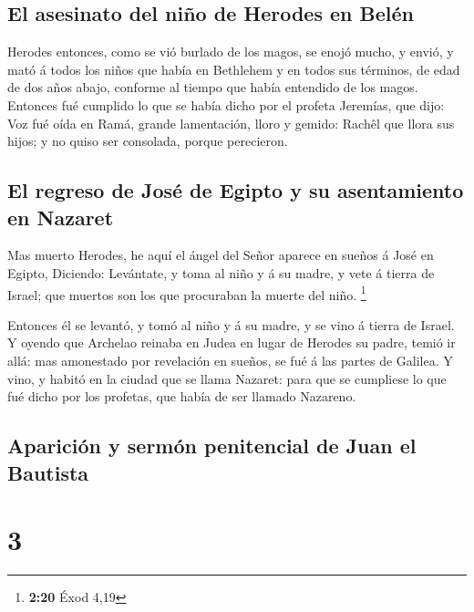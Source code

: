 \hypertarget{el-asesinato-del-niuxf1o-de-herodes-en-beluxe9n}{%
\subsection{El asesinato del niño de Herodes en
Belén}\label{el-asesinato-del-niuxf1o-de-herodes-en-beluxe9n}}

 Herodes entonces, como se vió burlado de los magos, se
enojó mucho, y envió, y mató á todos los niños que había en Bethlehem y
en todos sus términos, de edad de dos años abajo, conforme al tiempo que
había entendido de los magos.  Entonces fué cumplido lo
que se había dicho por el profeta Jeremías, que dijo: 
Voz fué oída en Ramá, grande lamentación, lloro y gemido: Rachêl que
llora sus hijos; y no quiso ser consolada, porque perecieron.

\hypertarget{el-regreso-de-josuxe9-de-egipto-y-su-asentamiento-en-nazaret}{%
\subsection{El regreso de José de Egipto y su asentamiento en
Nazaret}\label{el-regreso-de-josuxe9-de-egipto-y-su-asentamiento-en-nazaret}}

 Mas muerto Herodes, he aquí el ángel del Señor aparece
en sueños á José en Egipto,  Diciendo: Levántate, y toma
al niño y á su madre, y vete á tierra de Israel; que muertos son los que
procuraban la muerte del niño. \footnote{\textbf{2:20} Éxod 4,19}

 Entonces él se levantó, y tomó al niño y á su madre, y
se vino á tierra de Israel.  Y oyendo que Archelao
reinaba en Judea en lugar de Herodes su padre, temió ir allá: mas
amonestado por revelación en sueños, se fué á las partes de Galilea.
 Y vino, y habitó en la ciudad que se llama Nazaret: para
que se cumpliese lo que fué dicho por los profetas, que había de ser
llamado Nazareno.

\hypertarget{apariciuxf3n-y-sermuxf3n-penitencial-de-juan-el-bautista}{%
\subsection{Aparición y sermón penitencial de Juan el
Bautista}\label{apariciuxf3n-y-sermuxf3n-penitencial-de-juan-el-bautista}}

\hypertarget{section-2}{%
\section{3}\label{section-2}}


